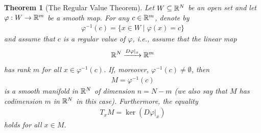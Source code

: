 \documentclass[11pt,a4paper,twoside,openany]{report}
\theoremstyle{my-theorem}
\newtheorem{theorem}{Theorem}[section]
\theoremstyle{non-theorem}
\begin{document}
		\begin{theorem}[The Regular Value Theorem]
			\label{thm:regular-value-theorem}
			Let $W \subseteq {\mathbb R}^N$ be an open set and let $\varphi: W \to {\mathbb R}^m$ be a smooth map. For any $c \in {\mathbb R}^m$, denote by
			\begin{align*}
				\varphi^{-1}(c) = \{x \in W \mid \varphi(x) = c\}
			\end{align*}
			and assume that $c$ is a \emph{regular value} of $\varphi$, i.e., assume that the linear map
			\begin{align*}
				{\mathbb R}^N \xrightarrow{D\varphi|_x} {\mathbb R}^m
			\end{align*}
			has rank $m$ for all $x \in \varphi^{-1}(c)$. If, moreover, $\varphi^{-1}(c) \neq \emptyset$, then
			\begin{align*}
				M = \varphi^{-1}(c)
			\end{align*}
			is a smooth manifold in ${\mathbb R}^N$ of dimension $n=N-m$ (we also say that $M$ has \emph{codimension} $m$ in ${\mathbb R}^N$ in this case). Furthermore, the equality
			\begin{align*}
				T_xM = \ker(D\varphi|_x)
			\end{align*}
			holds for all $x \in M$.
		\end{theorem}
		
\end{document}
